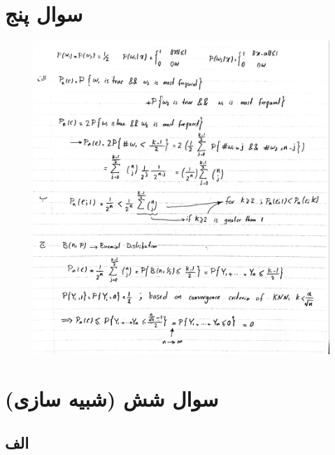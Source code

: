 \documentclass[12pt,onecolumn,a4paper]{article}
\begin{document}
\newpage
\section{سوال پنج}
\begin{figure}[h!]
    \begin{center}
    \includegraphics[width=\linewidth]{hand_written/5.jpg}
    \end{center}
\end{figure}

\newpage
\section{سوال شش (شبیه سازی)}
\subsection*{الف}
\end{document}
